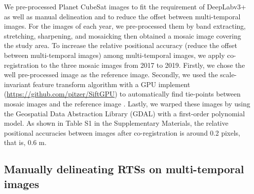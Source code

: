 \documentclass[authoryear,preprint,review,12pt]{elsarticle}
\begin{document}
We pre-processed Planet CubeSat images to fit the requirement of DeepLabv3+ as well as manual delineation and to reduce the offset between multi-temporal images. 
For the images of each year, we pre-processed them by band extracting, stretching, sharpening, and mosaicking then obtained a mosaic image covering the study area. 
To increase the relative positional accuracy (reduce the offset between multi-temporal images) among multi-temporal images, we apply co-registration to the three mosaic images from 2017 to 2019. 
Firstly, we chose the well pre-processed image \citep{huang2020using} as the reference image. 
Secondly, we used the scale-invariant feature transform algorithm \citep{lowe2004distinctive} with a GPU implement (\url{https://github.com/pitzer/SiftGPU}) to automatically find tie-points between %
 mosaic images and the reference image \citep{huang2016a}. 
Lastly, we warped these images by using the Geospatial Data Abstraction Library (GDAL) with a first-order polynomial model.
As shown in Table S1 in the Supplementary Materials, the relative positional accuracies between images after co-registration is around 0.2 pixels, that is, 0.6 m. 



\subsection{Manually delineating RTSs on multi-temporal images}
\label{sec_manu_delineating}
\end{document}
